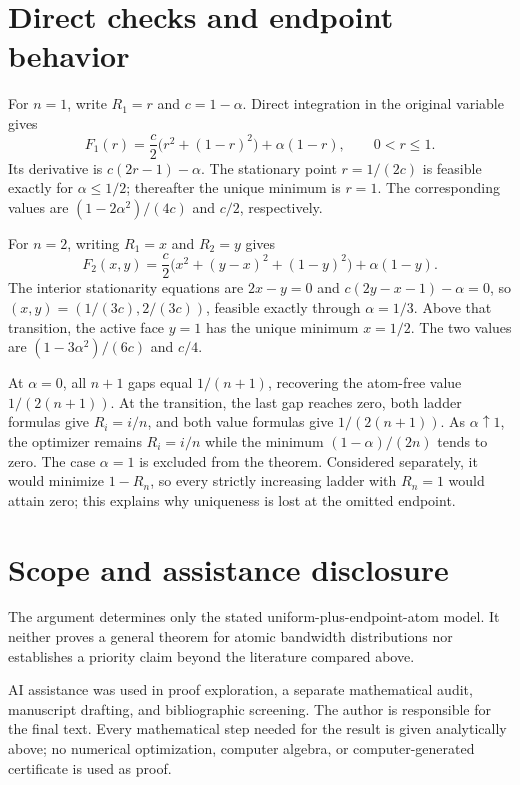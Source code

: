 \documentclass[11pt]{article}
\begin{document}
\section{Direct checks and endpoint behavior}

For \(n=1\), write \(R_1=r\) and \(c=1-\alpha\).  Direct integration in the
original variable gives
\[
 F_1(r)=\frac c2\bigl(r^2+(1-r)^2\bigr)+\alpha(1-r),
 \qquad 0<r\leq1.
\]
Its derivative is \(c(2r-1)-\alpha\).  The stationary point
\(r=1/(2c)\) is feasible exactly for \(\alpha\leq1/2\); thereafter the
unique minimum is \(r=1\).  The corresponding values are
\((1-2\alpha^2)/(4c)\) and \(c/2\), respectively.

For \(n=2\), writing \(R_1=x\) and \(R_2=y\) gives
\[
 F_2(x,y)=\frac c2\bigl(x^2+(y-x)^2+(1-y)^2\bigr)
           +\alpha(1-y).
\]
The interior stationarity equations are \(2x-y=0\) and
\(c(2y-x-1)-\alpha=0\), so
\((x,y)=(1/(3c),2/(3c))\), feasible exactly through
\(\alpha=1/3\).  Above that transition, the active face \(y=1\) has the
unique minimum \(x=1/2\).  The two values are
\((1-3\alpha^2)/(6c)\) and \(c/4\).

At \(\alpha=0\), all \(n+1\) gaps equal \(1/(n+1)\), recovering the
atom-free value \(1/(2(n+1))\).  At the transition, the last gap reaches
zero, both ladder formulas give \(R_i=i/n\), and both value formulas give
\(1/(2(n+1))\).  As \(\alpha\uparrow1\), the optimizer remains
\(R_i=i/n\) while the minimum \((1-\alpha)/(2n)\) tends to zero.  The case
\(\alpha=1\) is excluded from the theorem.  Considered separately, it would
minimize \(1-R_n\), so every strictly increasing ladder with \(R_n=1\) would
attain zero; this explains why uniqueness is lost at the omitted endpoint.

\section*{Scope and assistance disclosure}

The argument determines only the stated uniform-plus-endpoint-atom model.
It neither proves a general theorem for atomic bandwidth distributions nor
establishes a priority claim beyond the literature compared above.

AI assistance was used in proof exploration, a separate mathematical audit,
manuscript drafting, and bibliographic screening.  The author is responsible
for the final text.  Every mathematical step needed for the result is given
analytically above; no numerical optimization, computer algebra, or
computer-generated certificate is used as proof.



\end{document}
